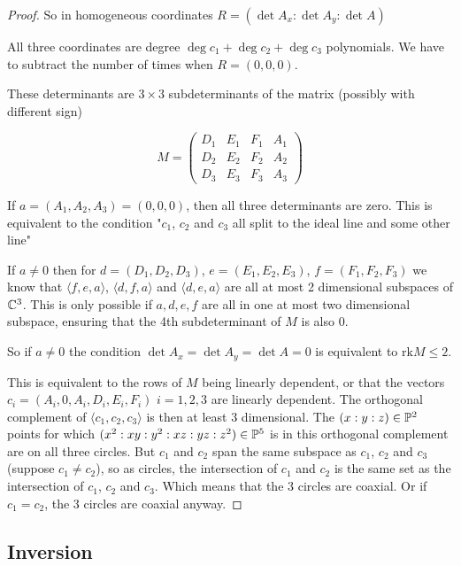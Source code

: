 \documentclass[a4paper]{article}
\begin{document}
\begin{proof}
So in homogeneous coordinates $R=(\det A_x:\det A_y:\det A)$

All three coordinates are degree $\deg c_1+\deg c_2+\deg c_3$ polynomials. We have to subtract the number of times when $R=(0,0,0)$.

These determinants are $3\times 3$ subdeterminants of the matrix (possibly with different sign)

$$M =
\begin{pmatrix}
D_1 & E_1 & F_1 & A_1\\[4pt]
D_2 & E_2 & F_2 & A_2\\[4pt]
D_3 & E_3 & F_3 & A_3
\end{pmatrix}$$


If $a=(A_1,A_2,A_3)=(0,0,0)$, then all three determinants are zero. This is equivalent to the condition "$c_1$, $c_2$ and $c_3$ all split to the ideal line and some other line"

If $a\ne 0$ then for $d=(D_1,D_2,D_3)$, $e=(E_1,E_2,E_3)$, $f=(F_1,F_2,F_3)$ we know that $\langle f,e,a\rangle$, $\langle d,f,a\rangle$ and $\langle d,e,a\rangle$ are all at most 2 dimensional subspaces of $\mathbb{C}^3$. This is only possible if $a,d,e,f$ are all in one at most two dimensional subspace, ensuring that the 4th subdeterminant of $M$ is also 0.

So if $a\ne 0$ the condition $\det A_x=\det A_y=\det A=0$ is equivalent to $\mathrm{rk} M\le 2$.

This is equivalent to the rows of $M$ being linearly dependent, or that the vectors $c_i=(A_i,0,A_i,D_i,E_i,F_i)$ $i=1,2,3$ are linearly dependent. The orthogonal complement of $\langle c_1,c_2,c_3\rangle$ is then at least 3 dimensional. The $(x:y:z)\in \mathbb{P}^2$ points for which $(x^2:xy:y^2:xz:yz:z^2)\in \mathbb{P}^5$ is in this orthogonal complement are on all three circles. But $c_1$ and $c_2$ span the same subspace as $c_1$, $c_2$ and $c_3$ (suppose $c_1\ne c_2$), so as circles, the intersection of $c_1$ and $c_2$ is the same set as the intersection of $c_1$, $c_2$ and $c_3$. Which means that the 3 circles are coaxial. Or if $c_1=c_2$, the 3 circles are coaxial anyway.




\end{proof}


\subsection{Inversion}
\end{document}
